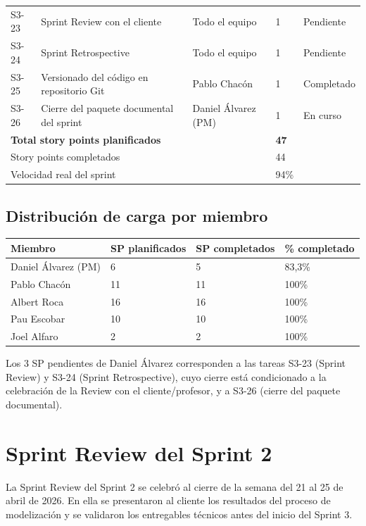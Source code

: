 \documentclass[11pt,a4paper]{article}
\begin{document}
\begin{longtable}{p{} p{} p{} p{} p{}}
S3-23 & Sprint Review con el cliente & Todo el equipo & 1 & Pendiente \\
S3-24 & Sprint Retrospective & Todo el equipo & 1 & Pendiente \\
S3-25 & Versionado del código en repositorio Git & Pablo Chacón & 1 & Completado \\
S3-26 & Cierre del paquete documental del sprint & Daniel Álvarez (PM) & 1 & En curso \\
\hline
\multicolumn{3}{l}{\textbf{Total story points planificados}} & \textbf{47} & \\
\multicolumn{3}{l}{Story points completados} & 44 & \\
\multicolumn{3}{l}{Velocidad real del sprint} & 94\% & \\
\end{longtable}

\subsection{Distribución de carga por miembro}

\begin{longtable}{p{} p{} p{} p{}}
\textbf{Miembro} & \textbf{SP planificados} & \textbf{SP completados} & \textbf{\% completado} \\
\hline
Daniel Álvarez (PM) & 6 & 5 & 83,3\% \\
Pablo Chacón        & 11 & 11 & 100\% \\
Albert Roca         & 16 & 16 & 100\% \\
Pau Escobar         & 10 & 10 & 100\% \\
Joel Alfaro         & 2  & 2  & 100\% \\
\end{longtable}

Los 3 SP pendientes de Daniel Álvarez corresponden a las tareas S3-23 (Sprint Review) y
S3-24 (Sprint Retrospective), cuyo cierre está condicionado a la celebración de la Review con
el cliente/profesor, y a S3-26 (cierre del paquete documental).

\section{Sprint Review del Sprint 2}

La Sprint Review del Sprint 2 se celebró al cierre de la semana del 21 al 25 de abril de
2026. En ella se presentaron al cliente los resultados del proceso de modelización y se
validaron los entregables técnicos antes del inicio del Sprint 3.
\end{document}
